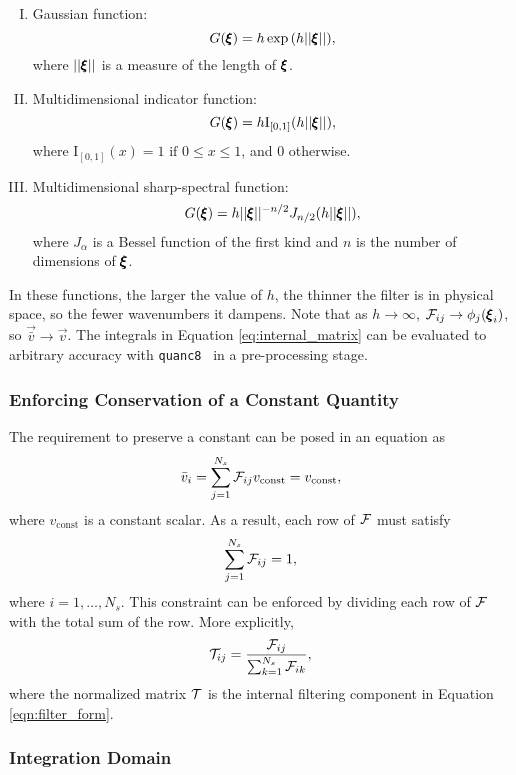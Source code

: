 \begin{enumerate}[I.]
\item Gaussian function:
$$
G({\pmb \xi}) = h \exp{(h||{\pmb \xi}||)},
$$
where $||{\pmb \xi}||$ is a measure of the length of ${\pmb \xi}$.
\item \label{item:multi_ind_func}Multidimensional indicator function:
$$
G({\pmb \xi}) = h\mathrm{I}_{[0,1]}(h||{\pmb \xi}||),
$$
where $\mathrm{I}_{[0,1]}(x) = 1 \text{ if } 0\le x\le 1$, and $0$ otherwise.
\item \label{item:sharp_spectral}Multidimensional sharp-spectral function:
$$
G({\pmb \xi}) = h||{\pmb \xi}||^{-n/2}
J_{n/2}(h||{\pmb \xi}||),
$$
where $J_\alpha$ is a Bessel function of the first kind and $n$ is the number of dimensions of ${\pmb \xi}$.
\end{enumerate}

In these functions, the larger the value of $h$, the thinner the filter is in physical space, so the fewer wavenumbers it dampens. Note that as $h \rightarrow \infty$, $\mathcal{F}_{ij}  \rightarrow \phi_j({\pmb \xi}_i)$, so $\vec{\bar{v}} \rightarrow \vec{{v}}$. The integrals in Equation \eqref{eq:internal_matrix} can be evaluated to arbitrary accuracy with \texttt{quanc8}~\cite{forsythe1977computer} in a pre-processing stage.

\subsubsection{Enforcing Conservation of a Constant Quantity}
The requirement to preserve a constant can be posed in an equation as
\begin{align}
\bar{v}_i = \sum^{N_s}_{j = 1} \mathcal{F}_{ij} v_{\text{const}} = v_{\text{const}},
\end{align}
where $v_{\text{const}}$ is a constant scalar. As a result, each row of $\mathcal{F}$ must satisfy
\begin{align}
\sum^{N_s}_{j = 1} \mathcal{F}_{ij} = 1,
\end{align}
where $i = 1,\dots,N_s$.
This constraint can be enforced by dividing each row of $\mathcal{F}$ with the total sum of the row. More explicitly,
\begin{align}
{\mathcal{T}}_{ij} = \frac{\mathcal{F}_{ij}}{\sum^{N_s}_{k = 1} \mathcal{F}_{ik}},
\end{align}
where the normalized matrix ${\mathcal{T}}$ is the internal filtering component in Equation \eqref{eqn:filter_form}.

\subsubsection{Integration Domain}

